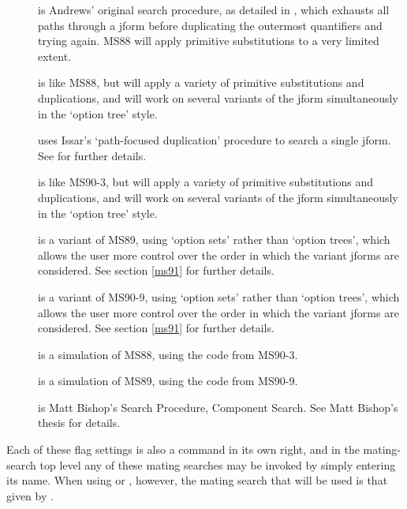 \begin{description}
\item[]  is Andrews' original
search procedure, as detailed in \cite{Andrews81}, which exhausts all paths through
a jform before duplicating the outermost quantifiers and trying again. MS88 will
apply primitive substitutions to a very limited extent.

\item[]  is like MS88, but will apply a variety of primitive substitutions
and duplications, and will work on several variants of
the jform simultaneously in the `option tree' style.

\item[]  uses Issar's `path-focused duplication' procedure to search
a single jform. See \cite{issar90} for further details.

\item[]  is like MS90-3, but will apply a variety of primitive substitutions
and duplications, and will work on several variants of the jform simultaneously in
the `option tree' style.

\item[]  is a variant of MS89, using `option sets' rather than `option trees',
which allows the user more control over the
order in which the variant jforms are considered. See section \ref{ms91} for further details.

\item[]  is a variant of MS90-9, using `option sets' rather than `option trees',
which allows the user more control over the
order in which the variant jforms are considered. See section \ref{ms91} for further details.

\item[]  is a simulation of MS88, using the code from MS90-3.

\item[]  is a simulation of MS89, using the code from MS90-9.

\item[]  is Matt Bishop's Search Procedure, Component Search.
See Matt Bishop's thesis for details.

\end{description}

Each of these flag settings is also a command in its own right, and in the mating-search
top level any of these mating searches may be invoked by simply entering its name.
When using  or , however, the mating search that
will be used is that given by .

